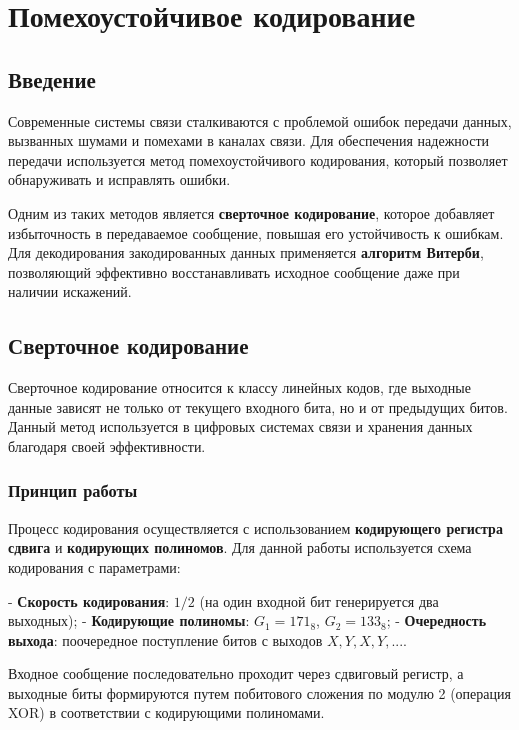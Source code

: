 \chapter{Помехоустойчивое кодирование}

\section{Введение}

Современные системы связи сталкиваются с проблемой ошибок передачи данных, вызванных шумами и помехами в каналах связи. Для обеспечения надежности передачи используется метод помехоустойчивого кодирования, который позволяет обнаруживать и исправлять ошибки.

Одним из таких методов является \textbf{сверточное кодирование}, которое добавляет избыточность в передаваемое сообщение, повышая его устойчивость к ошибкам. Для декодирования закодированных данных применяется \textbf{алгоритм Витерби}, позволяющий эффективно восстанавливать исходное сообщение даже при наличии искажений.

\section{Сверточное кодирование}

Сверточное кодирование относится к классу линейных кодов, где выходные данные зависят не только от текущего входного бита, но и от предыдущих битов. Данный метод используется в цифровых системах связи и хранения данных благодаря своей эффективности.

\subsection{Принцип работы}

Процесс кодирования осуществляется с использованием \textbf{кодирующего регистра сдвига} и \textbf{кодирующих полиномов}. Для данной работы используется схема кодирования с параметрами:

- \textbf{Скорость кодирования}: $1/2$ (на один входной бит генерируется два выходных);
- \textbf{Кодирующие полиномы}: $G_1 = 171_8$, $G_2 = 133_8$;
- \textbf{Очередность выхода}: поочередное поступление битов с выходов $X, Y, X, Y, ...$.

Входное сообщение последовательно проходит через сдвиговый регистр, а выходные биты формируются путем побитового сложения по модулю 2 (операция XOR) в соответствии с кодирующими полиномами.

